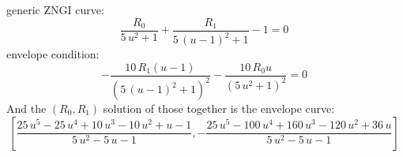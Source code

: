\documentclass{article}
\begin{document}
generic ZNGI curve:
\[\frac{R_{0}}{5 \, u^{2} + 1} + \frac{R_{1}}{5 \, {\left(u - 1\right)}^{2} + 1} - 1 = 0 \
\]
envelope condition:
\[-\frac{10 \, R_{1} {\left(u - 1\right)}}{{\left(5 \, {\left(u - 1\right)}^{2} + 1\right)}^{2}} - \frac{10 \, R_{0} u}{{\left(5 \, u^{2} + 1\right)}^{2}} = 0 \
\]
And the $(R_0,R_1)$ solution of those together is the envelope curve:
\[\left[\frac{25 \, u^{5} - 25 \, u^{4} + 10 \, u^{3} - 10 \, u^{2} + u - 1}{5 \, u^{2} - 5 \, u - 1}, -\frac{25 \, u^{5} - 100 \, u^{4} + 160 \, u^{3} - 120 \, u^{2} + 36 \, u}{5 \, u^{2} - 5 \, u - 1}\right] \
\]
\end{document}
